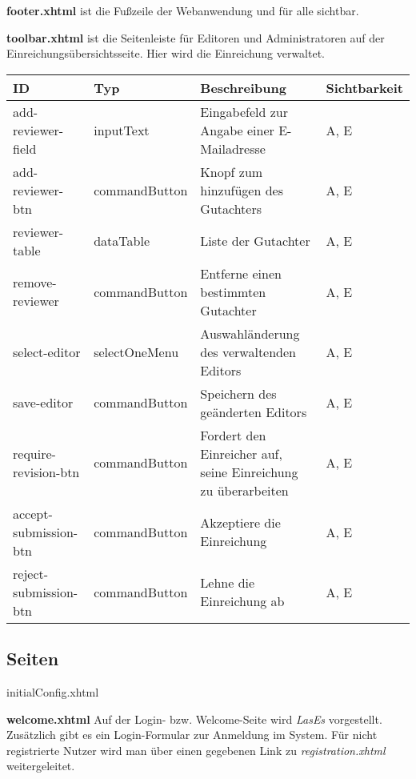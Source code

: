 \textbf{footer.xhtml} ist die Fußzeile der Webanwendung und für alle sichtbar.


\begin{samepage} %

\textbf{toolbar.xhtml} ist die Seitenleiste für Editoren und Administratoren auf der Einreichungsübersichtsseite. Hier wird die Einreichung verwaltet.
\nopagebreak

\begin{tabular}[H]{|m{2cm}|m{3cm}|m{6cm}|m{2.5cm}|}
	\hline
	\textbf{ID} & \textbf{Typ} & \textbf{Beschreibung} & \textbf{Sichtbarkeit} \\
	\hline
	\hline
	add-reviewer-field & inputText & Eingabefeld zur Angabe einer E-Mailadresse & A, E \\
	\hline
	add-reviewer-btn & commandButton & Knopf zum hinzufügen des Gutachters & A, E \\
	\hline
	reviewer-table & dataTable & Liste der Gutachter & A, E \\
	\hline
	remove-reviewer & commandButton & Entferne einen bestimmten Gutachter & A, E \\
	\hline
	select-editor & selectOneMenu & Auswahländerung des verwaltenden Editors & A, E \\
	\hline
	save-editor & commandButton & Speichern des geänderten Editors & A, E \\
	\hline
	require-revision-btn & commandButton & Fordert den Einreicher auf, seine Einreichung zu überarbeiten & A, E \\
	\hline
	accept-submission-btn & commandButton & Akzeptiere die Einreichung & A, E \\
	\hline
	reject-submission-btn & commandButton & Lehne die Einreichung ab & A, E \\
	\hline
\end{tabular}

\end{samepage}

\subsection{Seiten}
initialConfig.xhtml

\textbf{welcome.xhtml} Auf der Login- bzw. Welcome-Seite wird \emph{LasEs} vorgestellt.
Zusätzlich gibt es ein Login-Formular zur Anmeldung im System.
Für nicht registrierte Nutzer wird man über einen gegebenen Link zu \emph{registration.xhtml} weitergeleitet.


